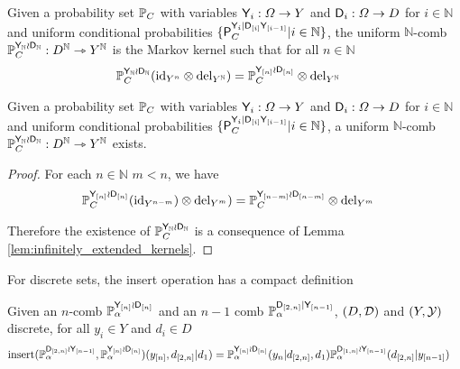 \begin{definition}
Given a probability set $\mathbb{P}_C$ with variables $\mathsf{Y}_i:\Omega\to Y$ and $\mathsf{D}_i:\Omega\to D$ for $i\in \mathbb{N}$ and uniform conditional probabilities $\{\mathsf{P}_C^{\mathsf{Y}_i|\mathsf{D}_{[i]}\mathsf{Y}_{[i-1]}}|i\in \mathbb{N}\}$, the uniform $\mathbb{N}$-comb $\mathbb{P}_C^{\mathsf{Y}_{\mathbb{N}}\wr \mathsf{D}_{\mathbb{N}}}:D^\mathbb{N}\rightarrowtriangle Y^\mathbb{N}$ is the Markov kernel such that for all $n\in \mathbb{N}$
\begin{align}
    \mathbb{P}_C^{\mathsf{Y}_{\mathbb{N}}\wr \mathsf{D}_{\mathbb{N}}}(\mathrm{id}_{Y^{n}}\otimes \mathrm{del}_{Y^{\mathbb{N}}}) &= \mathbb{P}_C^{\mathsf{Y}_{[n]}\wr \mathsf{D}_{[n]}}\otimes \mathrm{del}_{Y^{\mathbb{N}}}
\end{align}
\end{definition}

\begin{theorem}
Given a probability set $\mathbb{P}_C$ with variables $\mathsf{Y}_i:\Omega\to Y$ and $\mathsf{D}_i:\Omega\to D$ for $i\in \mathbb{N}$ and uniform conditional probabilities $\{\mathsf{P}_C^{\mathsf{Y}_i|\mathsf{D}_{[i]}\mathsf{Y}_{[i-1]}}|i\in \mathbb{N}\}$, a uniform $\mathbb{N}$-comb $\mathbb{P}_C^{\mathsf{Y}_{\mathbb{N}}\wr \mathsf{D}_{\mathbb{N}}}:D^\mathbb{N}\rightarrowtriangle Y^\mathbb{N}$ exists.
\end{theorem}

\begin{proof}
For each $n\in \mathbb{N}$ $m<n$, we have
\begin{align}
    \mathbb{P}_C^{\mathsf{Y}_{[n]}\wr \mathsf{D}_{[n]}}(\mathrm{id}_{Y^{n-m}})\otimes \mathrm{del}_{Y^m}) &= \mathbb{P}_C^{\mathsf{Y}_{[n-m]}\wr \mathsf{D}_{[n-m]}}\otimes \mathrm{del}_{Y^m}
\end{align}

Therefore the existence of $\mathbb{P}_C^{\mathsf{Y}_{\mathbb{N}}\wr \mathsf{D}_{\mathbb{N}}}$ is a consequence of Lemma \ref{lem:infinitely_extended_kernels}.
\end{proof}

For discrete sets, the insert operation has a compact definition

\begin{definition}
Given an $n$-comb $\mathbb{P}_\alpha^{\mathsf{Y}_{[n]}\wr \mathsf{D}_{[n]}}$ and an $n-1$ comb $\mathbb{P}_\alpha^{\mathsf{D}_{[2,n]}|\mathsf{Y}_{[n-1]}}$, $(D,\mathcal{D})$ and $(Y,\mathcal{Y})$ discrete, for all $y_i\in Y$ and $d_i\in D$
\begin{align}
    \mathrm{insert}(\mathbb{P}_\alpha^{\mathsf{D}_{[2,n]}\wr \mathsf{Y}_{[n-1]}},\mathbb{P}_\alpha^{\mathsf{Y}_{[n]}\wr \mathsf{D}_{[n]}})(y_{[n]},d_{[2,n]}|d_1) &= \mathbb{P}_\alpha^{\mathsf{Y}_{[n]}\wr \mathsf{D}_{[n]}}(y_n|d_{[2,n]},d_1)\mathbb{P}_\alpha^{\mathsf{D}_{[1,n]}\wr\mathsf{Y}_{[n-1]}}(d_{[2,n]}|y_{[n-1]})
\end{align}
\end{definition}

